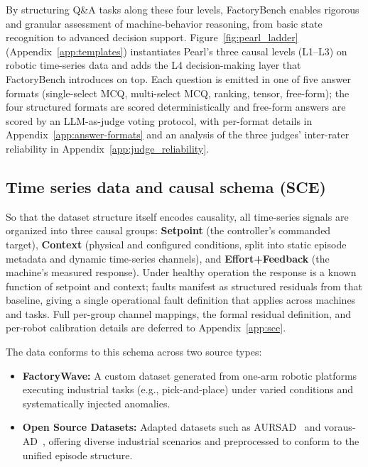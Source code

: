 By structuring Q\&A tasks along these four levels, FactoryBench enables rigorous and granular assessment of machine-behavior reasoning, from basic state recognition to advanced decision support. Figure~\ref{fig:pearl_ladder} (Appendix~\ref{app:templates}) instantiates Pearl's three causal levels (L1--L3) on robotic time-series data and adds the L4 decision-making layer that FactoryBench introduces on top. Each question is emitted in one of five answer formats (single-select MCQ, multi-select MCQ, ranking, tensor, free-form); the four structured formats are scored deterministically and free-form answers are scored by an LLM-as-judge voting protocol, with per-format details in Appendix~\ref{app:answer-formats} and an analysis of the three judges' inter-rater reliability in Appendix~\ref{app:judge_reliability}.


\subsection{Time series data and causal schema (SCE)}
\label{sec:sce}

So that the dataset structure itself encodes causality, all time-series signals are organized into three causal groups: \textbf{Setpoint} (the controller's commanded target), \textbf{Context} (physical and configured conditions, split into static episode metadata and dynamic time-series channels), and \textbf{Effort+Feedback} (the machine's measured response). Under healthy operation the response is a known function of setpoint and context; faults manifest as structured residuals from that baseline, giving a single operational fault definition that applies across machines and tasks. Full per-group channel mappings, the formal residual definition, and per-robot calibration details are deferred to Appendix~\ref{app:sce}.

The data conforms to this schema across two source types:

\begin{itemize}
    \item \textbf{FactoryWave:} A custom dataset generated from one-arm robotic platforms executing industrial tasks (e.g., pick-and-place) under varied conditions and systematically injected anomalies.
    \item \textbf{Open Source Datasets:} Adapted datasets such as AURSAD~\cite{leporowski2022aursad} and voraus-AD~\cite{brockmann2023vorausad}, offering diverse industrial scenarios and preprocessed to conform to the unified episode structure.
\end{itemize}

